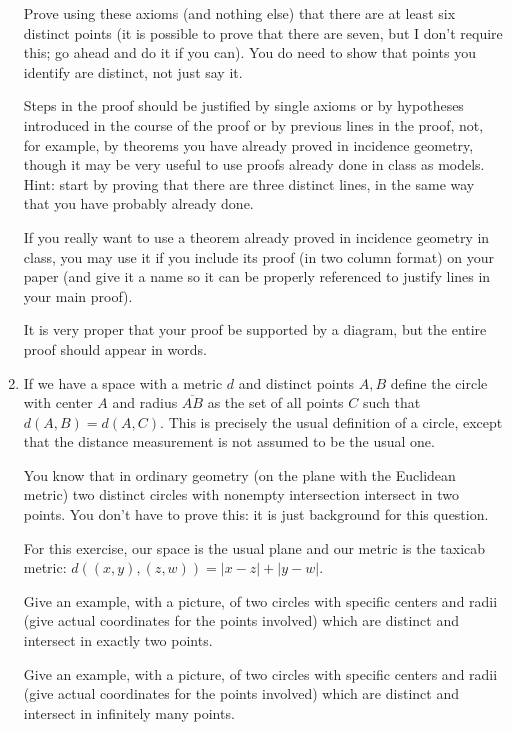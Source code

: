 \documentclass[12pt]{article}
\begin{document}
\begin{enumerate}
\begin{description}
\end{description}

Prove using these axioms (and nothing else) that there are at least six distinct points (it is possible to prove that there are seven, but I don't require this;  go ahead and do it if you can).   You do need to show that points you identify are distinct, not just say it.

Steps in the proof should be justified by single axioms or by hypotheses introduced in the course of the proof or by previous lines in the proof, not, for example, by theorems you have already proved in incidence geometry, though it may be very useful to use proofs already done in class as models.  Hint:  start by proving that there are three distinct lines, in the same way that you have probably already done.

If you really want to use a theorem already proved in incidence geometry in class, you may use it if you include its proof (in two column format) on your paper (and give it a name so it can be properly referenced to justify lines in your main proof).

It is very proper that your proof be supported by a diagram, but the entire proof should appear in words.

\newpage

\item  If we have a space with a metric $d$ and distinct points $A, B$ define the circle with center $A$ and radius $\overline{AB}$ as the set of all points
$C$ such that $d(A,B)=d(A,C)$.  This is precisely the usual definition of a circle, except that the distance measurement is not assumed to be the usual one.

You know that in ordinary geometry (on the plane with the Euclidean metric) two distinct circles with nonempty intersection intersect in two points.  You don't have to prove this:  it is just background for this question.

For this exercise, our space is the usual plane and our metric is the taxicab metric:  $d((x,y),(z,w)) = |x-z| + |y-w|$.

Give an example, with a picture, of two circles with specific centers and radii (give actual coordinates for the points involved) which are distinct and intersect in exactly two points.

Give an example, with a picture, of two circles with specific centers and radii (give actual coordinates for the points involved) which are distinct and intersect in infinitely many points.


\end{enumerate}
\end{document}
